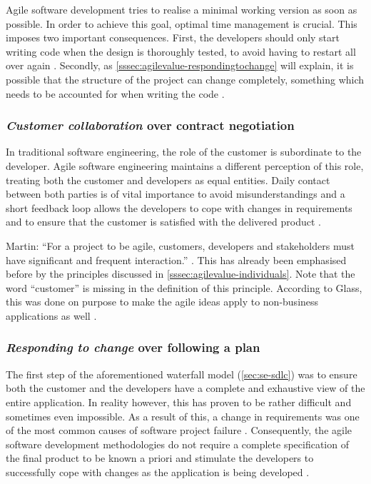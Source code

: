 Agile software development tries to realise a minimal working version as soon as possible. In order to achieve this goal, optimal time management is crucial. This imposes two important consequences. First, the developers should only start writing code when the design is thoroughly tested, to avoid having to restart all over again \cite{glass2001agile}. Secondly, as \autoref{sssec:agilevalue-respondingtochange} will explain, it is possible that the structure of the project can change completely, something which needs to be accounted for when writing the code \cite{martin2014}.

\subsubsection{\emph{Customer collaboration} over contract negotiation}
In traditional software engineering, the role of the customer is subordinate to the developer. Agile software engineering maintains a different perception of this role, treating both the customer and developers as equal entities. Daily contact between both parties is of vital importance to avoid misunderstandings and a short feedback loop allows the developers to cope with changes in requirements and to ensure that the customer is satisfied with the delivered product \cite{Hazzan2014}.

Martin: ``For a project to be agile, customers, developers and stakeholders must have significant and frequent interaction.'' \cite{martin2014}. This has already been emphasised before by the principles discussed in \autoref{sssec:agilevalue-individuals}. Note that the word ``customer'' is missing in the definition of this principle. According to Glass, this was done on purpose to make the agile ideas apply to non-business applications as well \cite{glass2001agile}.

\subsubsection{\emph{Responding to change} over following a plan}\label{sssec:agilevalue-respondingtochange}
The first step of the aforementioned waterfall model (\autoref{sec:se-sdlc}) was to ensure both the customer and the developers have a complete and exhaustive view of the entire application. In reality however, this has proven to be rather difficult and sometimes even impossible. As a result of this, a change in requirements was one of the most common causes of software project failure \cite{glass2001agile}. Consequently, the agile software development methodologies do not require a complete specification of the final product to be known a priori and stimulate the developers to successfully cope with changes as the application is being developed \cite{Hazzan2014}.

